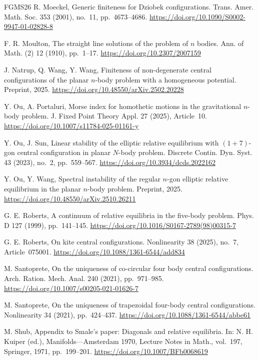 \documentclass[Threeside,11pt]{article}
\theoremstyle{definition}
\theoremstyle{remark}
\numberwithin{equation}{section}
\theoremstyle{remark}
\begin{document}
\begin{thebibliography}{FGMS26}
R. Moeckel,
Generic finiteness for Dziobek configurations.
Trans. Amer. Math. Soc. 353 (2001), no.~11, pp.~4673--4686.
\url{https://doi.org/10.1090/S0002-9947-01-02828-8}

F. R. Moulton,
The straight line solutions of the problem of $n$ bodies.
Ann. of Math. (2) 12 (1910), pp.~1--17.
\url{https://doi.org/10.2307/2007159}

J. Natrup, Q. Wang, Y. Wang,
Finiteness of non-degenerate central configurations of the planar $n$-body problem with a homogeneous potential.
Preprint, 2025.
\url{https://doi.org/10.48550/arXiv.2502.20228}

Y. Ou, A. Portaluri,
Morse index for homothetic motions in the gravitational
$n$-body problem.
J. Fixed Point Theory Appl. 27 (2025), Article~10.
\url{https://doi.org/10.1007/s11784-025-01161-y}

Y. Ou, J. Sun,
Linear stability of the elliptic relative equilibrium with
$(1+7)$-gon central configuration in planar $N$-body problem.
Discrete Contin. Dyn. Syst. 43 (2023), no.~2, pp.~559--567.
\url{https://doi.org/10.3934/dcds.2022162}

Y. Ou, Y. Wang,
Spectral instability of the regular $n$-gon elliptic
relative equilibrium in the planar $n$-body problem.
Preprint, 2025.
\url{https://doi.org/10.48550/arXiv.2510.26211}

G. E. Roberts,
A continuum of relative equilibria in the five-body problem.
Phys. D 127 (1999), pp.~141--145.
\url{https://doi.org/10.1016/S0167-2789(98)00315-7}

G. E. Roberts,
On kite central configurations.
Nonlinearity 38 (2025), no.~7, Article~075001.
\url{https://doi.org/10.1088/1361-6544/add834}

M. Santoprete,
On the uniqueness of co-circular four body central configurations.
Arch. Ration. Mech. Anal. 240 (2021), pp.~971--985.
\url{https://doi.org/10.1007/s00205-021-01626-7}

M. Santoprete,
On the uniqueness of trapezoidal four-body central configurations.
Nonlinearity 34 (2021), pp.~424--437.
\url{https://doi.org/10.1088/1361-6544/abbe61}

M. Shub,
Appendix to Smale's paper: Diagonals and relative equilibria.
In: N. H. Kuiper (ed.), Manifolds---Amsterdam 1970,
Lecture Notes in Math., vol.~197, Springer, 1971, pp.~199--201.
\url{https://doi.org/10.1007/BFb0068619}


\end{thebibliography}
\end{document}
